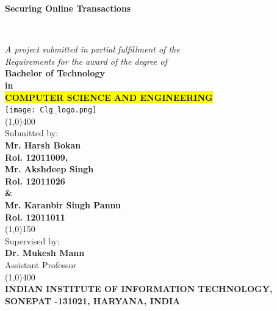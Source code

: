 \documentclass[12pt, oneside, a4paper]{article}
\begin{document}
\begin{titlepage}
\begin{center}
    \vspace{0.1cm}
    \begin{Large}\textbf{Securing Online Transactions}\end{Large}\\
    \vspace{1cm}\begin{large}
    \textit{A project submitted in partial fulfillment of the\\
    Requirements for the award of the degree of}\\
    \vspace{0.8cm}
    \textbf{Bachelor of Technology\\ in}\\
    \textbf{\colorbox{yellow}{COMPUTER SCIENCE AND ENGINEERING}}\\
    \vspace{0.3cm}
    \texttt{[image: Clg\_logo.png]}\\
    \vspace{0.5cm}
    \line(1,0){400}\\\vspace{0.3cm}
    Submitted by:\\
    \textbf{Mr. Harsh Bokan\\Rol. 12011009,\\
    \vspace{0.2cm}
    Mr. Akshdeep Singh\\Rol. 12011026\\ \& \\
    Mr. Karanbir Singh Pannu\\Rol. 12011011}\\
    \vspace{0.4cm}
    \line(1,0){150}\\
    \vspace{0.4cm}
    Supervised by:\\
    \textbf{Dr. Mukesh Mann}\\
    Assistant Professor\\
    \line(1,0){400}\\
    \vspace{1cm}
    \textbf{INDIAN INSTITUTE OF INFORMATION TECHNOLOGY,\\
    SONEPAT -131021, HARYANA, INDIA}\\\end{large}
    \vspace{1cm}
\end{center}
\end{titlepage}
\end{document}
